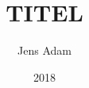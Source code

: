 \documentclass[
  BCOR=12mm,     %
  parskip=half,  %
  open=any,      %
  cleardoublepage=plain,  %
]{tudothesis}
\author{Jens Adam}
\title{TITEL}
\date{2018}
\begin{document}
\frontmatter
\maketitle

\makecorrectorpage

%
\tableofcontents

\mainmatter







\printbibliography

\appendix
% 
% 
% 

\backmatter


\cleardoublepage

\end{document}
